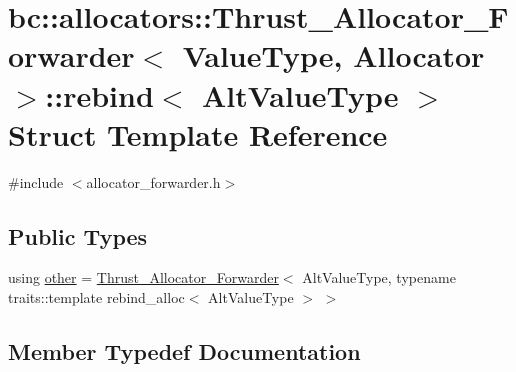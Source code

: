 \hypertarget{structbc_1_1allocators_1_1Thrust__Allocator__Forwarder_1_1rebind}{}\section{bc\+:\+:allocators\+:\+:Thrust\+\_\+\+Allocator\+\_\+\+Forwarder$<$ Value\+Type, Allocator $>$\+:\+:rebind$<$ Alt\+Value\+Type $>$ Struct Template Reference}
\label{structbc_1_1allocators_1_1Thrust__Allocator__Forwarder_1_1rebind}


{\ttfamily \#include $<$allocator\+\_\+forwarder.\+h$>$}

\subsection*{Public Types}
\begin{DoxyCompactItemize}
\item 
using \hyperlink{structbc_1_1allocators_1_1Thrust__Allocator__Forwarder_1_1rebind_ac1839568d1ecbf39d4136495cde990a8}{other} = \hyperlink{structbc_1_1allocators_1_1Thrust__Allocator__Forwarder}{Thrust\+\_\+\+Allocator\+\_\+\+Forwarder}$<$ Alt\+Value\+Type, typename traits\+::template rebind\+\_\+alloc$<$ Alt\+Value\+Type $>$ $>$
\end{DoxyCompactItemize}


\subsection{Member Typedef Documentation}
\mbox{\label{structbc_1_1allocators_1_1Thrust__Allocator__Forwarder_1_1rebind_ac1839568d1ecbf39d4136495cde990a8}} 
